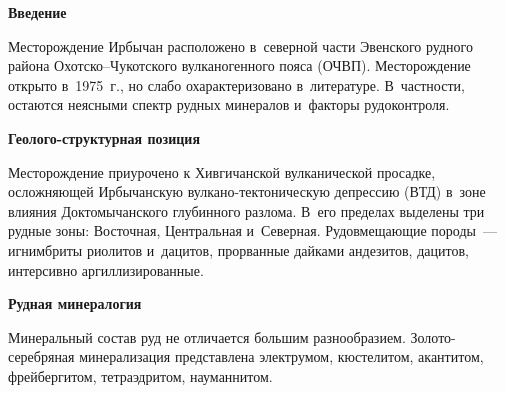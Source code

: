 
 



\makeProcTitle

\textbf{Введение}

Месторождение Ирбычан расположено в~северной части Эвенского рудного района Охотско–Чукотского вулканогенного пояса (ОЧВП). Месторождение открыто в~1975~г., но слабо охарактеризовано в~литературе. В~частности, остаются неясными спектр рудных минералов и~факторы рудоконтроля.

\textbf{Геолого-структурная позиция}

Месторождение приурочено к Хивгичанской вулканической просадке, осложняющей Ирбычанскую вулкано-тектоническую депрессию (ВТД) в~зо\-не влияния Доктомычанского глубинного разлома. В~его пределах выделены три рудные зоны: Восточная, Центральная и~Северная. Рудовмещающие породы~--- игнимбриты риолитов и~дацитов, прорванные дайками андезитов, дацитов, интерсивно аргиллизированные.

\textbf{Рудная минералогия}

Минеральный состав руд не отличается большим разнообразием. Золото-серебряная минерализация представлена электрумом, кюстелитом, акантитом, фрейбергитом, тетраэдритом, науманнитом.

